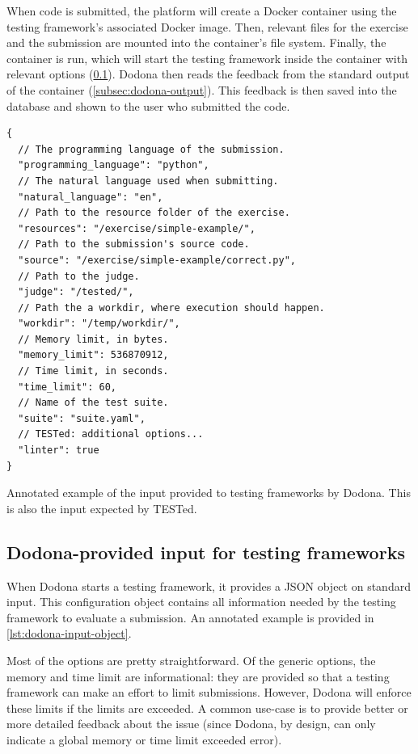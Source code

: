 \documentclass[../main]{subfiles}
\begin{document}
When code is submitted, the platform will create a Docker container using the testing framework's associated Docker image.
Then, relevant files for the exercise and the submission are mounted into the container's file system.
Finally, the container is run, which will start the testing framework inside the container with relevant options (\cref{subsec:dodona-input}).
Dodona then reads the feedback from the standard output of the container (\cref{subsec:dodona-output}).
This feedback is then saved into the database and shown to the user who submitted the code.

\begin{listing}
    \begin{verbatim}
{
  // The programming language of the submission.
  "programming_language": "python",
  // The natural language used when submitting.
  "natural_language": "en",
  // Path to the resource folder of the exercise.
  "resources": "/exercise/simple-example/",
  // Path to the submission's source code.
  "source": "/exercise/simple-example/correct.py",
  // Path to the judge.
  "judge": "/tested/",
  // Path the a workdir, where execution should happen.
  "workdir": "/temp/workdir/",
  // Memory limit, in bytes.
  "memory_limit": 536870912,
  // Time limit, in seconds.
  "time_limit": 60,
  // Name of the test suite.
  "suite": "suite.yaml",
  // TESTed: additional options...
  "linter": true
}
    \end{verbatim}
    \caption{
        Annotated example of the input provided to testing frameworks by Dodona.
        This is also the input expected by TESTed.
    }
    \label{lst:dodona-input-object}
\end{listing}

\subsection{Dodona-provided input for testing frameworks}\label{subsec:dodona-input}

When Dodona starts a testing framework, it provides a JSON object on standard input.
This configuration object contains all information needed by the testing framework to evaluate a submission.
An annotated example is provided in \cref{lst:dodona-input-object}.

Most of the options are pretty straightforward.
Of the generic options, the memory and time limit are informational: they are provided so that a testing framework can make an effort to limit submissions.
However, Dodona will enforce these limits if the limits are exceeded.
A common use-case is to provide better or more detailed feedback about the issue (since Dodona, by design, can only indicate a global memory or time limit exceeded error).
\end{document}
